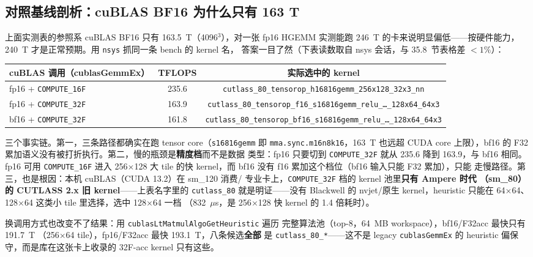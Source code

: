 \subsection{对照基线剖析：cuBLAS BF16 为什么只有 163 T}\label{sec:35-cublas}

上面实测表的参照系 cuBLAS BF16 只有 163.5~T（4096$^3$），对一张
fp16 HGEMM 实测能跑 246~T 的卡来说明显偏低——按硬件能力，
240~T 才是正常预期。用 \texttt{nsys} 抓同一条 bench 的 kernel 名，
答案一目了然（下表读数取自 nsys 会话，与 35.8~节表格差 $<1\%$）：

\begin{center}
\footnotesize
\begin{tabular}{lcc}
\toprule
cuBLAS 调用（cublasGemmEx） & TFLOPS & 实际选中的 kernel \\
\midrule
fp16 + \texttt{COMPUTE\_16F} & 235.6 & \texttt{cutlass\_80\_tensorop\_h16816gemm\_256x128\_32x3\_nn} \\
fp16 + \texttt{COMPUTE\_32F} & 163.9 & \texttt{cutlass\_80\_tensorop\_f16\_s16816gemm\_relu\_\ldots\_128x64\_64x3} \\
bf16 + \texttt{COMPUTE\_32F} & 161.8 & \texttt{cutlass\_80\_tensorop\_bf16\_s16816gemm\_relu\_\ldots\_128x64\_64x3} \\
\bottomrule
\end{tabular}
\end{center}

三个事实链。第一，三条路径都确实在跑 tensor core（\texttt{s16816gemm}
即 \texttt{mma.sync.m16n8k16}，163~T 也远超 CUDA core 上限），bf16 的
F32 累加语义没有被打折执行。第二，慢的瓶颈是\textbf{精度档}而不是数据
类型：fp16 只要切到 \texttt{COMPUTE\_32F} 就从 235.6 降到 163.9，与 bf16
相同。fp16 可用 \texttt{COMPUTE\_16F} 进入 256$\times$128 大 tile 的快
kernel，而 bf16 没有 f16 累加这个档位（bf16 输入只能 F32 累加），只能
走慢路径。第三，也是根因：本机 cuBLAS（CUDA 13.2）在 sm\_120 消费/
专业卡上，\texttt{COMPUTE\_32F} 档的 kernel 池里\textbf{只有 Ampere 时代
（sm\_80）的 CUTLASS 2.x 旧 kernel}——上表名字里的 \texttt{cutlass\_80}
就是明证——没有 Blackwell 的 nvjet/原生 kernel，heuristic 只能在
64$\times$64、128$\times$64 这类小 tile 里选择，选中 128$\times$64 一档
（832~$\mu$s，是 256$\times$128 快 kernel 的 1.4 倍耗时）。

换调用方式也改变不了结果：用 \texttt{cublasLtMatmulAlgoGetHeuristic} 遍历
完整算法池（top-8，64~MB workspace），bf16/F32acc 最快只有 191.7~T
（256$\times$64 tile），fp16/F32acc 最快 193.1~T，八条候选\textbf{全部}
是 \texttt{cutlass\_80\_*}——这不是 legacy \texttt{cublasGemmEx} 的
heuristic 偏保守，而是库在这张卡上收录的 32F-acc kernel 只有这些。

